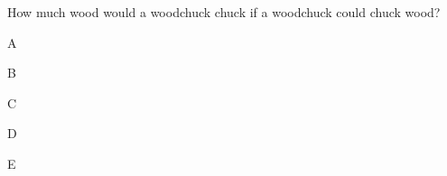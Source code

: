 \documentclass[11pt,nochoiceboxes,solutions]{exam3}
\begin{document}
\begin{problem}{2}
  How much wood would a woodchuck chuck if a woodchuck could chuck wood?
  \begin{multichoice}[v1=abcde,v2=edcba,v3=abedc,v4=cdeba]
    \item A
    \item B
    \item C
    \item D
    \item E
  \end{multichoice}
\end{problem}


\showpoints
\end{document}
